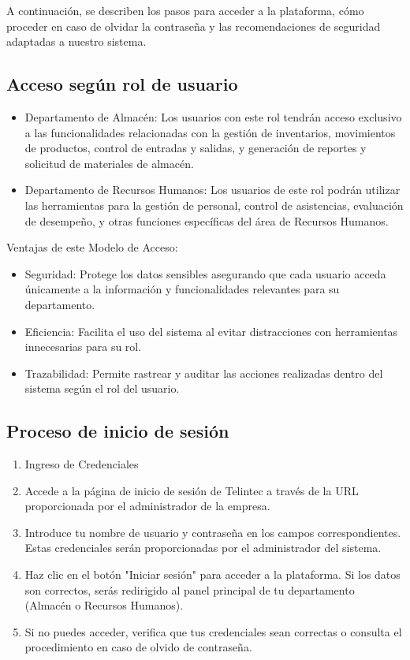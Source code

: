 \begin{justify}
A continuación, se describen los pasos para acceder a la plataforma, cómo proceder en caso de olvidar la contraseña y las recomendaciones de seguridad adaptadas a nuestro sistema. 
\end{justify}

\subsection{Acceso según rol de usuario}

\begin{itemize}
    \item  Departamento de Almacén: Los usuarios con este rol tendrán acceso exclusivo a las funcionalidades relacionadas con la gestión de inventarios, movimientos de productos, control de entradas y salidas, y generación de reportes y solicitud de materiales de almacén. 
    \item Departamento de Recursos Humanos: Los usuarios de este rol podrán utilizar las herramientas para la gestión de personal, control de asistencias, evaluación de desempeño, y otras funciones específicas del área de Recursos Humanos. 
\end{itemize}

Ventajas de este Modelo de Acceso:

\begin{itemize}
    \item Seguridad: Protege los datos sensibles asegurando que cada usuario acceda únicamente a la información y funcionalidades relevantes para su departamento. 
    \item Eficiencia: Facilita el uso del sistema al evitar distracciones con herramientas innecesarias para su rol. 
    \item Trazabilidad: Permite rastrear y auditar las acciones realizadas dentro del sistema según el rol del usuario. 
\end{itemize}

\subsection{Proceso de inicio de sesión}
\begin{enumerate}
    \item Ingreso de Credenciales 
    \item Accede a la página de inicio de sesión de Telintec a través de la URL proporcionada por el administrador de la empresa. 
    \item Introduce tu nombre de usuario y contraseña en los campos correspondientes. Estas credenciales serán proporcionadas por el administrador del sistema. 
    \item Haz clic en el botón "Iniciar sesión" para acceder a la plataforma. Si los datos son correctos, serás redirigido al panel principal de tu departamento (Almacén o Recursos Humanos). 
    \item Si no puedes acceder, verifica que tus credenciales sean correctas o consulta el procedimiento en caso de olvido de contraseña. 
\end{enumerate}

